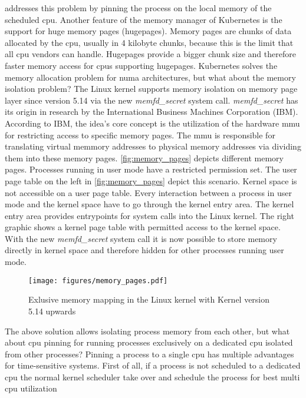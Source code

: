 \documentclass[titlepage]{report}
\begin{document}
addresses this problem by pinning the process on the local memory of the scheduled \gls{cpu}. Another feature of the memory manager of Kubernetes is the support for huge memory pages (hugepages).
Memory pages are chunks of data allocated by the \gls{cpu}, usually in 4 kilobyte chunks, because this is the limit that all \gls{cpu} vendors can handle. 
Hugepages provide a bigger chunk size and therefore faster memory access for \glspl{cpu} supporting hugepages\cite{DebianWiki}. Kubernetes solves the memory allocation problem for \gls{numa}
architectures, but what about the memory isolation problem? The Linux kernel supports memory isolation on memory page layer since version 5.14 via the new \emph{memfd\_secret} system call\cite{Linux514}.
\emph{memfd\_secret} has its origin in research by the International Business Machines Corporation (IBM)\cite{IBMAddressSpaceIsolation}\cite{LWNSecretMemory}. According to IBM, the idea's core concept is the utilization of the hardware \gls{mmu}
for restricting access to specific memory pages. The \gls{mmu} is responsible for translating virtual memmory addresses to physical memory addresses via dividing them into these memory pages\cite{MMU}.
\autoref{fig:memory_pages} depicts different memory pages. Processes running in user mode have a restricted permission set. The user page table on the left in \autoref{fig:memory_pages} depict this scenario.
Kernel space is not accessible on a user page table. Every interaction between a process in user mode and the kernel space have to go through the kernel entry area. The kernel entry area provides entrypoints
for system calls into the Linux kernel. The right graphic shows a kernel page table with permitted access to the kernel space. With the new \emph{memfd\_secret} system call it is now possible to store memory
directly in kernel space and therefore hidden for other processes running user mode.
\begin{figure}[H]
  \centering
  \texttt{[image: figures/memory\_pages.pdf]}
  \caption{Exlusive memory mapping in the Linux kernel with Kernel version 5.14 upwards\cite{IBMAddressSpaceIsolation}}\label{fig:memory_pages}
\end{figure}
The above solution allows isolating process memory from each other, but what about \gls{cpu} pinning for running processes exclusively on a dedicated \gls{cpu} isolated from other processes? Pinning a process to a single \gls{cpu}
has multiple advantages for time-sensitive systems. First of all, if a process is not scheduled to a dedicated \gls{cpu} the normal kernel scheduler take over and schedule the process for best multi \gls{cpu} utilization
\end{document}
